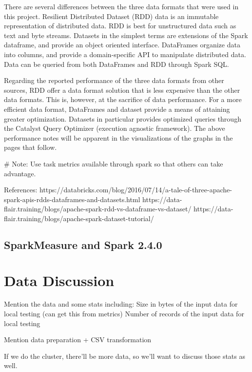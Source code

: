 \documentclass[conference]{IEEEtran}
\begin{document}

There are several differences between the three data formats that were used in this project.
Resilient Distributed Dataset (RDD) data is an immutable representation of distributed data.
RDD is best for unstructured data such as text and byte streams.
Datasets in the simplest terms are extensions of the Spark dataframe, and provide an object oriented interface.
DataFrames organize data into columns, and provide a domain-specific API to manipulate distributed data.
Data can be queried from both DataFrames and RDD through Spark SQL.

Regarding the reported performance of the three data formats from other sources,
RDD offer a data format solution that is less expensive than the other data formats.
This is, however, at the sacrifice of data performance. For a more efficient data format, DataFrames and dataset provide
a means of attaining greater optimization.
Datasets in particular provides optimized queries through the Catalyst Query Optimizer (execution agnostic framework).
The above performance notes will be apparent in the visualizations of the graphs in the pages that follow.

# Note: Use task metrics available through spark so that others can take advantage.

References:
https://databricks.com/blog/2016/07/14/a-tale-of-three-apache-spark-apis-rdds-dataframes-and-datasets.html
https://data-flair.training/blogs/apache-spark-rdd-vs-dataframe-vs-dataset/
https://data-flair.training/blogs/apache-spark-dataset-tutorial/

\subsection{SparkMeasure and Spark 2.4.0}

\section{Data Discussion}
Mention the data and some stats including:
Size in bytes of the input data for local testing (can get this from metrics)
Number of records of the input data for local testing

Mention data preparation + CSV transformation

If we do the cluster, there'll be more data, so we'll want to discuss those stats as well.
\end{document}
